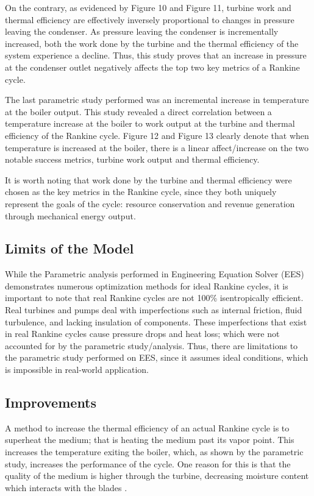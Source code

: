 \documentclass[12pt, letterpaper]{article}
\begin{document}
On the contrary, as evidenced by Figure 10 and Figure 11, turbine work and thermal efficiency are effectively inversely proportional to changes in pressure leaving the condenser.  As pressure leaving the condenser is incrementally increased, both the work done by the turbine and the thermal efficiency of the system experience a decline.  Thus, this study proves that an increase in pressure at the condenser outlet negatively affects the top two key metrics of a Rankine cycle.

The last parametric study performed was an incremental increase in temperature at the boiler output.  This study revealed a direct correlation between a temperature increase at the boiler to work output at the turbine and thermal efficiency of the Rankine cycle.  Figure 12 and Figure 13 clearly denote that when temperature is increased at the boiler, there is a linear affect/increase on the two notable success metrics, turbine work output and thermal efficiency.

It is worth noting that work done by the turbine and thermal efficiency were chosen as the key metrics in the Rankine cycle, since they both uniquely represent the goals of the cycle: resource conservation and revenue generation through mechanical energy output.

\subsection{Limits of the Model}

While the Parametric analysis performed in Engineering Equation Solver (EES) demonstrates numerous optimization methods for ideal Rankine cycles, it is important to note that real Rankine cycles are not 100\% isentropically efficient.  Real turbines and pumps deal with imperfections such as internal friction, fluid turbulence, and lacking insulation of components.  These imperfections that exist in real Rankine cycles cause pressure drops and heat loss; which were not accounted for by the parametric study/analysis. Thus, there are limitations to the parametric study performed on EES, since it assumes ideal conditions, which is impossible in real-world application.
\subsection{Improvements}

A method to increase the thermal efficiency of an actual Rankine cycle is to superheat the medium; that is heating the medium past its vapor point. This increases the temperature exiting the boiler, which, as shown by the parametric study, increases the performance of the cycle. One reason for this is that the quality of the medium is higher through the turbine, decreasing moisture content which interacts with the blades \cite{MIT2}.
\end{document}

